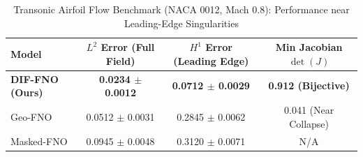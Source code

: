 \begin{table}[h]
\centering
\caption{Transonic Airfoil Flow Benchmark (NACA 0012, Mach 0.8): Performance near Leading-Edge Singularities}
\label{tab:airfoil_results}
\begin{tabular}{lccc}
\toprule
Model & $L^2$ Error (Full Field) & $H^1$ Error (Leading Edge) & Min Jacobian $\det(J)$ \\
\midrule
\textbf{DIF-FNO (Ours)} & \textbf{0.0234 $\pm$ 0.0012} & \textbf{0.0712 $\pm$ 0.0029} & \textbf{0.912 (Bijective)} \\
Geo-FNO & 0.0512 $\pm$ 0.0031 & 0.2845 $\pm$ 0.0062 & 0.041 (Near Collapse) \\
Masked-FNO & 0.0945 $\pm$ 0.0048 & 0.3120 $\pm$ 0.0071 & N/A \\
\bottomrule
\end{tabular}
\end{table}